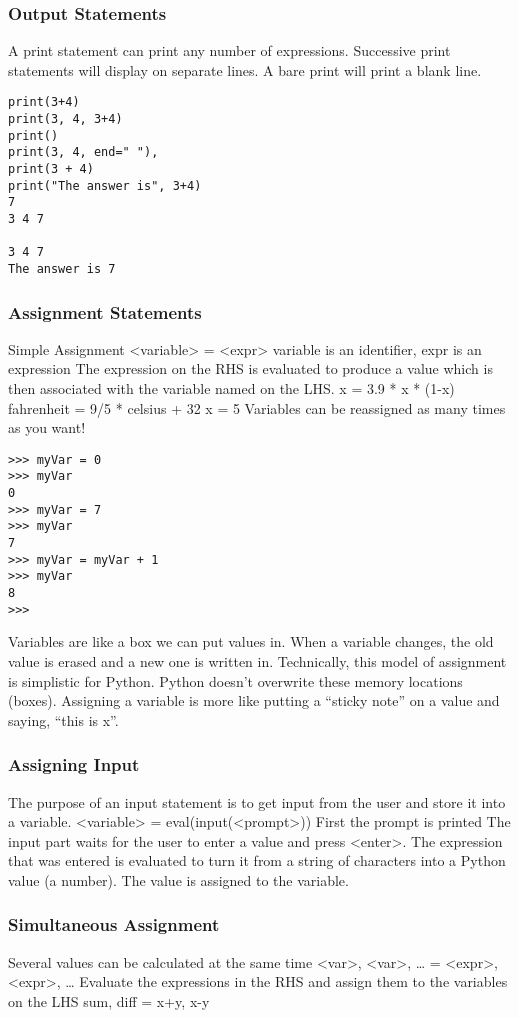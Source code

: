 \documentclass[12pt,a4paper,final,twoside,onecolumn,titlepage]{book}
\begin{document}
\subsubsection{Output Statements}
A print statement can print any number of expressions. Successive print statements will display on separate lines. A bare print will print a blank line.
\lstset{language=Python, tabsize=4}
\begin{lstlisting}
print(3+4)
print(3, 4, 3+4)
print()
print(3, 4, end=" "),
print(3 + 4)
print("The answer is", 3+4)
7
3 4 7

3 4 7
The answer is 7
\end{lstlisting}

\subsubsection{Assignment Statements}
Simple Assignment
<variable> = <expr>
variable is an identifier, expr is an expression
The expression on the RHS is evaluated to produce a value which is then associated with the variable named on the LHS.
x = 3.9 * x * (1-x)
fahrenheit = 9/5 * celsius + 32
x = 5
Variables can be reassigned as many times as you want!
\lstset{language=Python, tabsize=4}
\begin{lstlisting}
>>> myVar = 0
>>> myVar
0
>>> myVar = 7
>>> myVar
7
>>> myVar = myVar + 1
>>> myVar
8
>>> 
\end{lstlisting}
Variables are like a box we can put values in. When a variable changes, the old value is erased and a new one is written in. Technically, this model of assignment is simplistic for Python. Python doesn't overwrite these memory locations (boxes). Assigning a variable is more like putting a “sticky note” on a value and saying, “this is x”.
\subsubsection{Assigning Input}
The purpose of an input statement is to get input from the user and store it into a variable.
<variable> = eval(input(<prompt>))
First the prompt is printed The input part waits for the user to enter a value and press <enter>. The expression that was entered is evaluated to turn it from a string of characters into a Python value (a number). The value is assigned to the variable.
\subsubsection{Simultaneous Assignment}
Several values can be calculated at the same time
<var>, <var>, … = <expr>, <expr>, …
Evaluate the expressions in the RHS and assign them to the variables on the LHS
sum, diff = x+y, x-y
\end{document}
